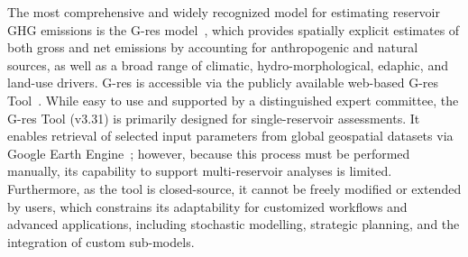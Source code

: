 \documentclass[review, authoryear, 1p]{elsarticle} %
\begin{document}

The most comprehensive and widely recognized model for estimating reservoir \ac{GHG} emissions is the G-res model~\citep{Prairie2017b, Prairie2021}, which provides spatially explicit estimates of both gross and net emissions by accounting for anthropogenic and natural sources, as well as a broad range of climatic, hydro-morphological, edaphic, and land-use drivers.
G-res is accessible via the publicly available web-based G-res Tool~\citep{prairie2017gres}. %
While easy to use and supported by a distinguished expert committee, the G-res Tool (v3.31) is primarily designed for single-reservoir assessments.
It enables retrieval of selected input parameters from global geospatial datasets via Google Earth Engine~\cite{Gorelick2017}; however, because this process must be performed manually, its capability to support multi-reservoir analyses is limited.
Furthermore, as the tool is closed-source, it cannot be freely modified or extended by users, which constrains its adaptability for customized workflows and advanced applications, including stochastic modelling, strategic planning, and the integration of custom sub-models.


\end{document}
